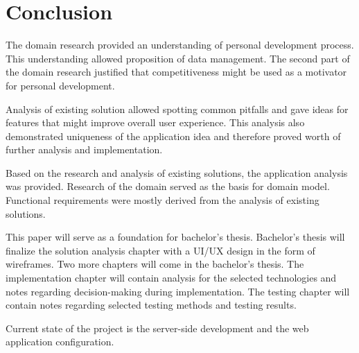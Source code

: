 
\chapter{Conclusion}\label{ch:conclusion}

The domain research provided an understanding of personal development process.
This understanding allowed proposition of data management.
The second part of the domain research justified that competitiveness might be used as a motivator for personal development.

Analysis of existing solution allowed spotting common pitfalls and gave ideas for features that might improve overall user experience.
This analysis also demonstrated uniqueness of the application idea and therefore proved worth of further analysis and implementation.

Based on the research and analysis of existing solutions, the application analysis was provided.
Research of the domain served as the basis for domain model.
Functional requirements were mostly derived from the analysis of existing solutions.

This paper will serve as a foundation for bachelor's thesis.
Bachelor's thesis will finalize the solution analysis chapter with a UI/UX design in the form of wireframes.
Two more chapters will come in the bachelor's thesis.
The implementation chapter will contain analysis for the selected technologies and notes regarding decision-making during implementation.
The testing chapter will contain notes regarding selected testing methods and testing results.

Current state of the project is the server-side development and the web application configuration.